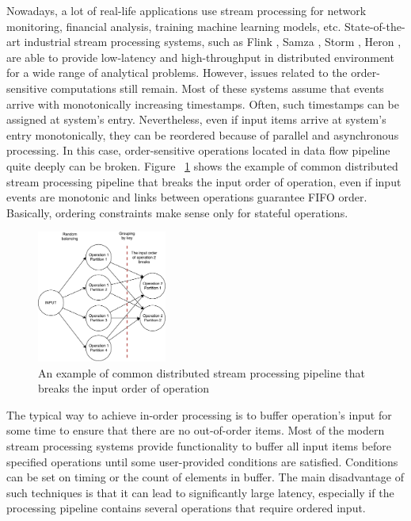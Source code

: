 
\label {fs-intro}

Nowadays, a lot of real-life applications use stream processing for network monitoring, financial analysis, training machine learning models, etc. State-of-the-art industrial stream processing systems, such as Flink \cite{carbone2015apache}, Samza \cite{Noghabi:2017:SSS:3137765.3137770}, Storm \cite{apache:storm}, Heron \cite{Kulkarni:2015:THS:2723372.2742788}, are able to provide low-latency and high-throughput in distributed environment for a wide range of analytical problems. However, issues related to the order-sensitive computations still remain. Most of these  systems assume that events arrive with monotonically increasing timestamps. Often, such timestamps can be assigned at system's entry. Nevertheless, even if input items arrive at system's entry monotonically, they can be reordered because of parallel and asynchronous processing. In this case, order-sensitive operations located in data flow pipeline quite deeply can be broken. Figure ~\ref{break-order-dataflow} shows the example of common distributed stream processing pipeline that breaks the input order of operation, even if input events are monotonic and links between operations guarantee FIFO order. Basically, ordering constraints make sense only for stateful operations.

\begin{figure}[htbp]
  \centering
  \includegraphics[width=0.38\textwidth]{pics/break_order_pipeline}
  \caption{An  example of common distributed stream processing pipeline that breaks the input order of operation}
  \label {break-order-dataflow}
\end{figure}

The typical way to achieve in-order processing is to buffer operation's input for some time to ensure that there are no out-of-order items. Most of the modern stream processing systems provide functionality to buffer all input items before specified operations until some user-provided conditions are satisfied. Conditions can be set on timing or the count of elements in buffer. The main disadvantage of such techniques is that it can lead to significantly large latency, especially if the processing pipeline contains several operations that require ordered input. 

